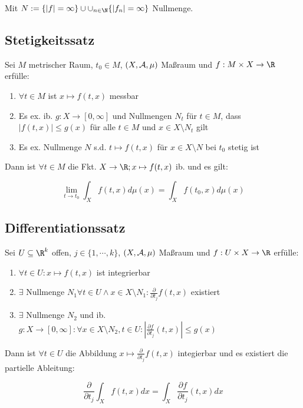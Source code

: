 Mit $N := \{|f| = \infty\} \cup \cup_{n \in \N} \{|f_n| = \infty\}$ Nullmenge.

\subsection*{Stetigkeitssatz}

Sei $M$ metrischer Raum, $t_0 \in M$, $(X,\mathcal{A},\mu)$ Maßraum und $f : M \times X \to \R$ erfülle:

\begin{enumerate}[label=(\alph*)]
	\item $\forall t \in M$ ist $x \mapsto f(t,x)$ messbar
	\item Es ex. ib. $g : X \to [0,\infty]$ und Nullmengen $N_t$ für $t \in M$, dass $|f(t,x)| \leq g(x)$ für alle $t \in M$ und $x \in X \setminus N_t$ gilt
	\item Es ex. Nullmenge $N$ s.d. $t \mapsto f(t,x)$ für $x \in X \setminus N$ bei $t_0$ stetig ist
\end{enumerate}

Dann ist $\forall t \in M$ die Fkt. $X \to \R; x \mapsto f(t,x)$ ib. und es gilt:

\vspace{-2mm}
$$\lim_{t \to t_0} \int_X f(t,x) d\mu(x) = \int_X f(t_0,x) d\mu(x)$$

\subsection*{Differentiationssatz}

Sei $U \subseteq \R^k$ offen, $j \in \{1,\cdots,k\}$, $(X,\mathcal{A},\mu)$ Maßraum und $f : U \times X \to \R$ erfülle:

\begin{enumerate}[label=(\alph*)]
	\item $\forall t \in U : x \mapsto f(t,x)$ ist integrierbar
	\item $\exists$ Nullmenge $N_1 \forall t \in U \land x \in X \setminus N_1 : \frac{\partial}{\partial t_j} f(t,x)$ existiert
	\item $\exists$ Nullmenge $N_2$ und ib. $g : X \to [0,\infty] : \forall x \in X \setminus N_2, t \in U : |\frac{\partial f}{\partial t_j} (t,x)| \leq g(x)$
\end{enumerate}

Dann ist $\forall t \in U$ die Abbildung $x \mapsto \frac{\partial}{\partial t_j} f(t,x)$ integierbar und es existiert die partielle Ableitung:

$$\frac{\partial}{\partial t_j} \int_X f(t,x) dx = \int_X \frac{\partial f}{\partial t_j} (t,x) dx$$


